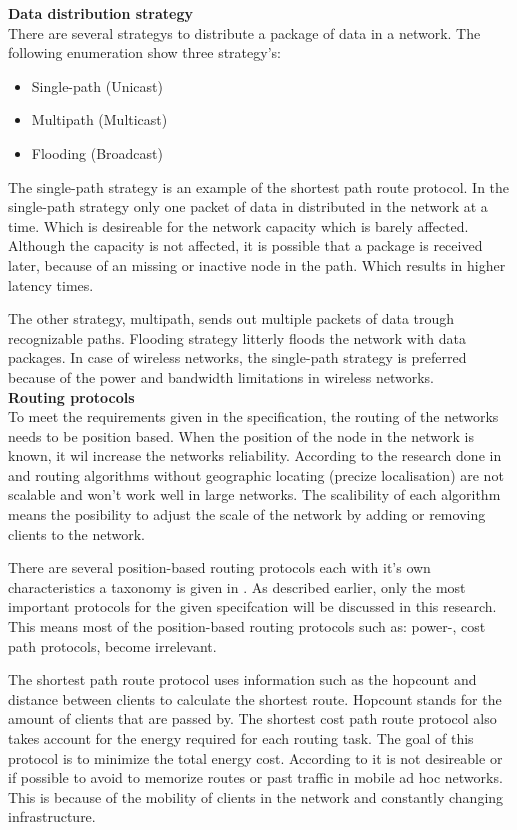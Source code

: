 \documentclass[10pt,a4paper]{article}
\begin{document}
\textbf{Data distribution strategy}\\
There are several strategys to distribute a package of data in a network. The following enumeration show three strategy's:
\begin{itemize}
\setlength\itemsep{0em}
    \item Single-path (Unicast)
    \item Multipath (Multicast)
    \item Flooding (Broadcast)
\end{itemize}

The single-path strategy is an example of the shortest path route protocol. In the single-path strategy only one packet of data in distributed in the network at a time. Which is desireable for the network capacity which is barely affected. Although the capacity is not affected, it is possible that a package is received later, because of an missing or inactive node in the path. \cite{position-based} Which results in higher latency times.

The other strategy, multipath, sends out multiple packets of data trough recognizable paths. Flooding strategy litterly floods the network with data packages. In case of wireless networks, the single-path strategy is preferred because of the power and bandwidth limitations in wireless networks. \cite{position-based}\\

\textbf{Routing protocols}\\
To meet the requirements given in the specification, the routing of the networks needs to be position based. When the position of the node in the network is known, it wil increase the networks reliability. \cite{position-based} According to the research done in \cite{geographicalrouting} and \cite{scalablelocation} routing algorithms without geographic locating (precize localisation) are not scalable and won't work well in large networks.
The scalibility of each algorithm means the posibility to adjust the scale of the network by adding or removing clients to the network.

There are several position-based routing protocols each with it's own characteristics a taxonomy is given in \cite{position-based}. As described earlier, only the most important protocols for the given specifcation will be discussed in this research. This means most of the position-based routing protocols such as: power-, cost path protocols, become irrelevant.

The shortest path route protocol uses information such as the hopcount and distance between clients to calculate the shortest route. Hopcount stands for the amount of clients that are passed by. The shortest cost path route protocol also takes account for the energy required for each routing task. The goal of this protocol is to minimize the total energy cost. According to \cite{position-based} it is not desireable or if possible to avoid to memorize routes or past traffic in mobile ad hoc networks. This is because of the mobility of clients in the network and constantly changing infrastructure.
\end{document}

